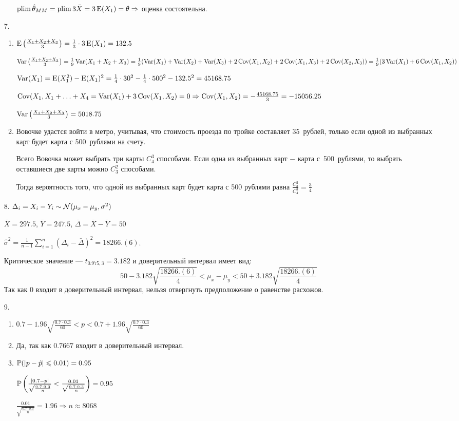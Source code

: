 \begin{enumerate}
\begin{enumerate}
$\plim \hat \theta_{MM} = \plim 3 \bar X = 3 \E(X_1) = \theta \Rightarrow$ оценка состоятельна.
\end{enumerate}
\item[7.]
\begin{enumerate}
\item $\E\left(\frac{X_1 + X_2 + X_3}{3} \right) = \frac{1}{3} \cdot 3 \E(X_1) = 132.5$

$\Var\left(\frac{X_1 + X_2 + X_3}{3} \right) = \frac{1}{9} \Var(X_1 + X_2 + X_3) =
\frac{1}{9} (\Var(X_1) + \Var(X_2) + \Var(X_3) + 2 \Cov(X_1, X_2) + 2\Cov(X_1, X_3) + 2\Cov(X_2, X_3)) =
\frac{1}{9}(3\Var(X_1) + 6\Cov(X_1,X_2))$

$\Var(X_1) = \E(X_1^2) - \E(X_1)^2 = \frac{1}{4} \cdot 30^2 - \frac{1}{4} \cdot 500^2 - 132.5^2 = 45168.75$

$\Cov(X_1, X_1 + \ldots + X_4 = \Var(X_1) + 3\Cov(X_1,X_2) = 0 \Rightarrow \Cov(X_1,X_2) = -\frac{45168.75}{3} = -15056.25$

$\Var\left(\frac{X_1 + X_2 + X_3}{3} \right) = 5018.75$

\item Вовочке удастся войти в метро, учитывая, что стоимость проезда по тройке составляет 35~рублей, только если одной из выбранных карт будет карта с 500~рублями на счету.

Всего Вовочка может выбрать три карты $C_4^3$ способами. Если одна из выбранных карт $-$ карта с~500~рублями, то выбрать оставшиеся две карты можно $C_3^2$ способами.

Тогда вероятность того, что одной из выбранных карт будет карта с 500 рублями равна $\displaystyle\frac{C_3^2}{C_4^3} = \frac{3}{4}$

\end{enumerate}
\item[8.] $\Delta_i = X_i - Y_i \sim \cN(\mu_x - \mu_y, \sigma^2)$

$\bar X = 297.5$, $\bar Y = 247.5$, $\bar \Delta = \bar X - \bar Y = 50$

$\hat \sigma^2 = \frac{1}{n-1} \sum_{i=1}^n (\Delta_i - \bar \Delta)^2 = 18266.(6)$.

Критическое значение — $t_{0.975, 3} = 3.182$ и доверительный интервал имеет вид:
\[
50 - 3.182 \sqrt{\frac{18266.(6)}{4}} < \mu_x - \mu_y < 50 + 3.182 \sqrt{\frac{18266.(6)}{4}}
\]
Так как $0$ входит в доверительный интервал, нельзя отвергнуть предположение о равенстве расхожов.
\item[9.]
\begin{enumerate}
\item $0.7 - 1.96 \sqrt{\frac{0.7 \cdot 0.3}{60}} < p < 0.7 + 1.96 \sqrt{\frac{0.7 \cdot 0.3}{60}} $
\item Да, так как $0.7667$ входит в доверительный интервал.
\item $\P(|p - \hat p| \leq 0.01) = 0.95$

$\P\left(\frac{|0.7 - p|}{\sqrt{\frac{0.7 \cdot 0.3}{n}}} < \frac{0.01}{\sqrt{\frac{0.7 \cdot 0.3}{n}}} \right) = 0.95$

$\frac{0.01}{\sqrt{\frac{0.7 \cdot 0.3}{n}}} = 1.96 \Rightarrow n \approx 8068$
\end{enumerate}
\end{enumerate}


